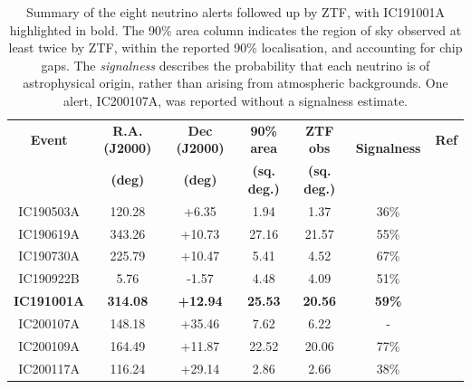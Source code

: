 \documentclass{nature_plusfigure}
\begin{document}
\begin{methods}
\begin{table}
\centering
	\begin{tabular}{||c c c c c c c ||} 
		\hline
		\textbf{Event} & \textbf{R.A. (J2000)} & \textbf{Dec (J2000)} & \textbf{90\% area} & \textbf{ZTF obs} &~ \textbf{Signalness}& \textbf{Ref}\\
		& \textbf{(deg)}&\textbf{(deg)}& \textbf{(sq. deg.)}& \textbf{(sq. deg.)} &&\\
		\hline
		IC190503A & 120.28 & +6.35 & 1.94& 1.37 & 36\%&\cite{blaufuss:gcn24378,2019ATel12730....1S}\\
		IC190619A & 343.26 & +10.73 & 27.16& 21.57 & 55\%&\cite{blaufuss:gcn24910, 2019ATel12879....1S}\\
		IC190730A & 225.79 & +10.47 & 5.41& 4.52 & 67\%&\cite{stein:gcn25225,2019ATel12974....1S}\\
		IC190922B & 5.76 & -1.57 & 4.48 & 4.09 & 51\%&\cite{blaufuss:gcn25806,2019ATel13125....1S, stein:gcn25824}\\
		\textbf{IC191001A} & \textbf{314.08} & \textbf{+12.94} & \textbf{25.53} & \textbf{20.56} & \textbf{59\%}& \textbf{\cite{stein:gcn25913,2019ATel13160....1S, stein:gcn25929}}\\
		IC200107A & 148.18 & +35.46 & 7.62 & 6.22 & - &\cite{stein:gcn26655,stein:gcn26667}\\
		IC200109A & 164.49 & +11.87 & 22.52 & 20.06 & 77\%&\cite{stein:gcn26696,reusch:gcn26747}\\
		IC200117A & 116.24 & +29.14 & 2.86 &  2.66 & 38\%&\cite{lagunas:gcn26802,reusch:gcn26813, reusch:gcn26816}\\
		\hline
	\end{tabular}
	\caption{Summary of the eight neutrino alerts followed up by ZTF, with IC191001A highlighted in bold. The 90\% area column indicates the region of sky observed at least twice by ZTF, within the reported 90\% localisation, and accounting for chip gaps. The \textit{signalness} describes the probability that each neutrino is of astrophysical origin, rather than arising from atmospheric backgrounds. One alert, IC200107A, was reported without a signalness estimate.}
	\label{tab:nu_alerts}
\end{table}


\end{methods}
\end{document}
